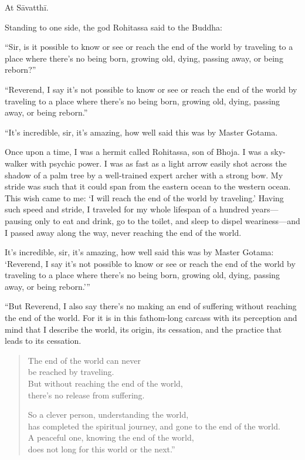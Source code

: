 \documentclass[12pt,openany]{book}%
\begin{document}
At \textsanskrit{Sāvatthī}. 

Standing to one side, the god Rohitassa said to the Buddha: 

“Sir, is it possible to know or see or reach the end of the world by traveling to a place where there’s no being born, growing old, dying, passing away, or being reborn?” 

“Reverend, I say it’s not possible to know or see or reach the end of the world by traveling to a place where there’s no being born, growing old, dying, passing away, or being reborn.” 

“It’s incredible, sir, it’s amazing, how well said this was by Master Gotama. 

Once upon a time, I was a hermit called Rohitassa, son of Bhoja. I was a sky-walker with psychic power. I was as fast as a light arrow easily shot across the shadow of a palm tree by a well-trained expert archer with a strong bow. My stride was such that it could span from the eastern ocean to the western ocean. This wish came to me: ‘I will reach the end of the world by traveling.’ Having such speed and stride, I traveled for my whole lifespan of a hundred years—pausing only to eat and drink, go to the toilet, and sleep to dispel weariness—and I passed away along the way, never reaching the end of the world. 

It’s incredible, sir, it’s amazing, how well said this was by Master Gotama: ‘Reverend, I say it’s not possible to know or see or reach the end of the world by traveling to a place where there’s no being born, growing old, dying, passing away, or being reborn.’” 

“But Reverend, I also say there’s no making an end of suffering without reaching the end of the world. For it is in this fathom-long carcass with its perception and mind that I describe the world, its origin, its cessation, and the practice that leads to its cessation. 

\begin{verse}%
The end of the world can never \\
be reached by traveling. \\
But without reaching the end of the world, \\
there’s no release from suffering. 

So a clever person, understanding the world, \\
has completed the spiritual journey, and gone to the end of the world. \\
A peaceful one, knowing the end of the world, \\
does not long for this world or the next.” 

%
\end{verse}
\end{document}
